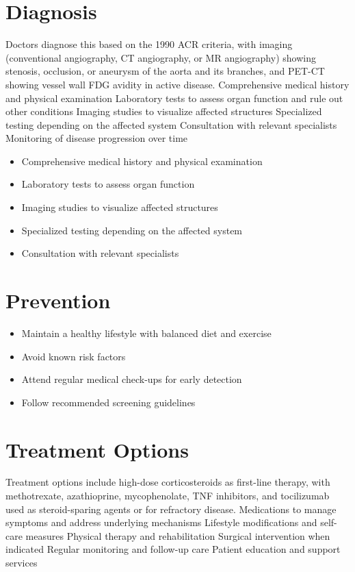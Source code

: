 \section{Diagnosis}
Doctors diagnose this based on the 1990 ACR criteria, with imaging (conventional angiography, CT angiography, or MR angiography) showing stenosis, occlusion, or aneurysm of the aorta and its branches, and PET-CT showing vessel wall FDG avidity in active disease. Comprehensive medical history and physical examination Laboratory tests to assess organ function and rule out other conditions Imaging studies to visualize affected structures Specialized testing depending on the affected system Consultation with relevant specialists Monitoring of disease progression over time

\begin{itemize}[noitemsep]
  \item Comprehensive medical history and physical examination
  \item Laboratory tests to assess organ function
  \item Imaging studies to visualize affected structures
  \item Specialized testing depending on the affected system
  \item Consultation with relevant specialists
\end{itemize}
\section{Prevention}
\begin{itemize}[noitemsep]
  \item Maintain a healthy lifestyle with balanced diet and exercise
  \item Avoid known risk factors
  \item Attend regular medical check-ups for early detection
  \item Follow recommended screening guidelines
\end{itemize}
\section{Treatment Options}
Treatment options include high-dose corticosteroids as first-line therapy, with methotrexate, azathioprine, mycophenolate, TNF inhibitors, and tocilizumab used as steroid-sparing agents or for refractory disease. Medications to manage symptoms and address underlying mechanisms Lifestyle modifications and self-care measures Physical therapy and rehabilitation Surgical intervention when indicated Regular monitoring and follow-up care Patient education and support services

